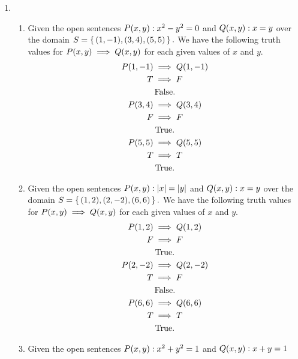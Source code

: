 \documentclass[12pt]{article}
\makeatletter
\newcommand*{\arabicodd}[1]{%
  \expandafter\@arabicodd\csname c@#1\endcsname
}
\newcommand*{\@arabicodd}[1]{%
  \@arabic{\numexpr(#1)*2-1\relax}%
}
\makeatother
\begin{document}
\begin{enumerate}[label=2.\arabicodd*, start=16]
    \item
      \begin{enumerate}[label=(\alph*)]
        \item Given the open sentences $P\qty(x,y): x^2 - y^2 = 0$ and $Q\qty(x,y): x = y$
              over the domain $S = \set{\qty(1,-1),\qty(3,4),\qty(5,5)}.$
              We have the following truth values for $P\qty(x,y) \implies Q\qty(x,y)$ for each
              given values of $x$ and $y.$
              \begin{gather*}
                P\qty(1,-1) \implies Q\qty(1,-1)\\
                T \implies F\\
                \qq{False.}\\
                P\qty(3,4) \implies Q\qty(3,4)\\
                F \implies F\\
                \qq{True.}\\
                P\qty(5,5) \implies Q\qty(5,5)\\
                T \implies T\\
                \qq{True.}\\
              \end{gather*}
        \item Given the open sentences $P\qty(x,y): \abs{x} = \abs{y}$ and $Q\qty(x,y): x = y$
              over the domain $S = \set{\qty(1,2),\qty(2,-2),\qty(6,6)}.$
              We have the following truth values for $P\qty(x,y) \implies Q\qty(x,y)$ for each
              given values of $x$ and $y.$
              \begin{gather*}
                P\qty(1,2) \implies Q\qty(1,2)\\
                F \implies F\\
                \qq{True.}\\
                P\qty(2,-2) \implies Q\qty(2,-2)\\
                T \implies F\\
                \qq{False.}\\
                P\qty(6,6) \implies Q\qty(6,6)\\
                T \implies T\\
                \qq{True.}\\
              \end{gather*}
        \item Given the open sentences $P\qty(x,y): x^2 + y^2 = 1$ and $Q\qty(x,y): x + y = 1$

\end{enumerate}
\end{enumerate}
\end{document}
